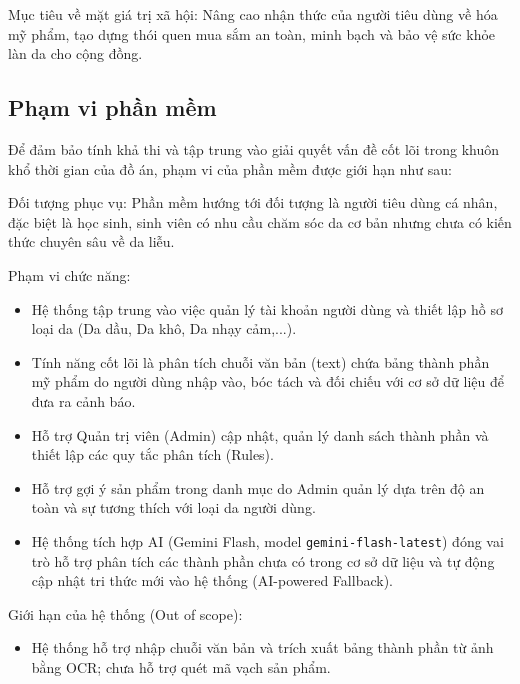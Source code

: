 \documentclass[12pt,a4paper]{article}
\begin{document}
Mục tiêu về mặt giá trị xã hội: Nâng cao nhận thức của người tiêu dùng về hóa mỹ phẩm, tạo dựng thói quen mua sắm an toàn, minh bạch và bảo vệ sức khỏe làn da cho cộng đồng.
\subsection{Phạm vi phần mềm}
Để đảm bảo tính khả thi và tập trung vào giải quyết vấn đề cốt lõi trong khuôn khổ thời gian của đồ án, phạm vi của phần mềm được giới hạn như sau:

Đối tượng phục vụ: Phần mềm hướng tới đối tượng là người tiêu dùng cá nhân, đặc biệt là học sinh, sinh viên có nhu cầu chăm sóc da cơ bản nhưng chưa có kiến thức chuyên sâu về da liễu.

Phạm vi chức năng:
\begin{itemize}
    \item Hệ thống tập trung vào việc quản lý tài khoản người dùng và thiết lập hồ sơ loại da (Da dầu, Da khô, Da nhạy cảm,...).
    \item Tính năng cốt lõi là phân tích chuỗi văn bản (text) chứa bảng thành phần mỹ phẩm do người dùng nhập vào, bóc tách và đối chiếu với cơ sở dữ liệu để đưa ra cảnh báo.
    \item Hỗ trợ Quản trị viên (Admin) cập nhật, quản lý danh sách thành phần và thiết lập các quy tắc phân tích (Rules).
    \item Hỗ trợ gợi ý sản phẩm trong danh mục do Admin quản lý dựa trên độ an toàn và sự tương thích với loại da người dùng.
    \item Hệ thống tích hợp AI (Gemini Flash, model \texttt{gemini-flash-latest}) đóng vai trò hỗ trợ phân tích các thành phần chưa có trong cơ sở dữ liệu và tự động cập nhật tri thức mới vào hệ thống (AI-powered Fallback).
\end{itemize}







Giới hạn của hệ thống (Out of scope): 
\begin{itemize}
    \item Hệ thống hỗ trợ nhập chuỗi văn bản và trích xuất bảng thành phần từ ảnh bằng OCR; chưa hỗ trợ quét mã vạch sản phẩm.
\end{itemize}
\end{document}
